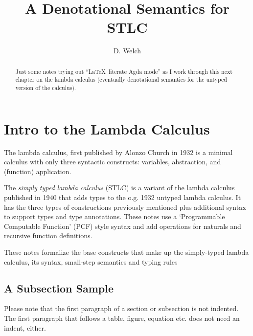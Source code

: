 \documentclass[runningheads]{llncs}
\begin{document}
\title{A Denotational Semantics for STLC}
\author{D. Welch}
\institute{}
\maketitle

\begin{abstract}
Just some notes trying out ``\LaTeX \ literate Agda mode'' as I work through 
this next chapter on the lambda calculus (eventually denotational semantics for
the untyped version of the calculus).
\end{abstract}

\section{Intro to the Lambda Calculus} 

The lambda calculus, first published by Alonzo Church in 1932 is a minimal calculus
with only three syntactic constructs: variables, abstraction, and (function) 
application. 

The \textit{simply typed lambda calculus} (STLC) is a variant of the lambda calculus
published in 1940 that adds types to the o.g. 1932 untyped lambda calculus. It has the
three types of constructions previously mentioned plus additional syntax to support 
types and type annotations. These notes use a `Programmable Computable Function' (PCF)
style syntax and add operations for naturals and recursive function definitions.

These notes formalize the base constructs that make up the simply-typed lambda calculus,
its syntax, small-step semantics and typing rules



\subsection{A Subsection Sample}
Please note that the first paragraph of a section or subsection is
not indented. The first paragraph that follows a table, figure,
equation etc. does not need an indent, either.
\end{document}
